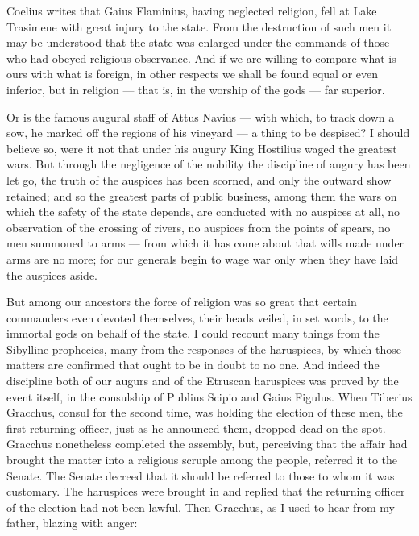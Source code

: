  Coelius writes that Gaius Flaminius, having neglected religion, fell at Lake Trasimene with great injury to the state. From the destruction of such men it may be understood that the state was enlarged under the commands of those who had obeyed religious observance. And if we are willing to compare what is ours with what is foreign, in other respects we shall be found equal or even inferior, but in religion — that is, in the worship of the gods — far superior.

 Or is the famous augural staff of Attus Navius — with which, to track down a sow, he marked off the regions of his vineyard — a thing to be despised? I should believe so, were it not that under his augury King Hostilius waged the greatest wars. But through the negligence of the nobility the discipline of augury has been let go, the truth of the auspices has been scorned, and only the outward show retained; and so the greatest parts of public business, among them the wars on which the safety of the state depends, are conducted with no auspices at all, no observation of the crossing of rivers, no auspices from the points of spears, no men summoned to arms — from which it has come about that wills made under arms are no more; for our generals begin to wage war only when they have laid the auspices aside.

 But among our ancestors the force of religion was so great that certain commanders even devoted themselves, their heads veiled, in set words, to the immortal gods on behalf of the state. I could recount many things from the Sibylline prophecies, many from the responses of the haruspices, by which those matters are confirmed that ought to be in doubt to no one. And indeed the discipline both of our augurs and of the Etruscan haruspices was proved by the event itself, in the consulship of Publius Scipio and Gaius Figulus. When Tiberius Gracchus, consul for the second time, was holding the election of these men, the first returning officer, just as he announced them, dropped dead on the spot. Gracchus nonetheless completed the assembly, but, perceiving that the affair had brought the matter into a religious scruple among the people, referred it to the Senate. The Senate decreed that it should be referred to those to whom it was customary. The haruspices were brought in and replied that the returning officer of the election had not been lawful. Then Gracchus, as I used to hear from my father, blazing with anger:

